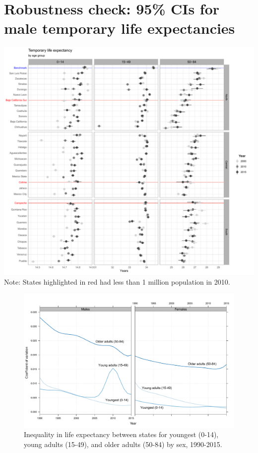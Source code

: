 \documentclass[11.5pt]{article}
\begin{document}
{\section*{Robustness check: 95\% CIs for male temporary life expectancies}


\includegraphics[scale=.65]{Figures/Temp_e0_CIs_RR_Final.pdf}
Note: States highlighted in red had less than 1 million population in 2010.



\begin{figure}[h!]
\centering
\caption{Inequality in life expectancy between states for youngest (0-14), young adults (15-49), and older adults (50-84) by sex, 1990-2015.}
\label{fig:Gini}
\includegraphics[scale=.45]{Figures/CVfig.pdf}
\end{figure}

}
\end{document}
